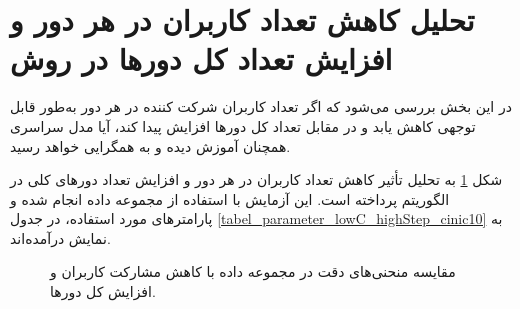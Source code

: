 \section{
	تحلیل کاهش تعداد کاربران در هر دور و افزایش تعداد کل دورها در روش
}
در این بخش بررسی می‌شود که اگر تعداد کاربران شرکت کننده در هر دور به‌طور قابل توجهی کاهش یابد و در مقابل تعداد کل دورها افزایش پیدا کند، آیا مدل سراسری همچنان آموزش دیده و به همگرایی خواهد رسید.

شکل
\ref{result_lowC_highStep_cinic10}
به تحلیل تأثیر کاهش تعداد کاربران در هر دور و افزایش تعداد دورهای کلی در الگوریتم
پرداخته است. این آزمایش با استفاده از مجموعه داده
انجام شده و پارامترهای مورد استفاده، در جدول
\ref{tabel_parameter_lowC_highStep_cinic10}
به نمایش درآمده‌اند.

\begin{figure}[t!]
	\centering
	\hspace{0.8mm}
	\caption{
		مقایسه منحنی‌های دقت در مجموعه داده
		با کاهش مشارکت کاربران و افزایش  کل دورها.
	}
	\label{result_lowC_highStep_cinic10}
\end{figure}


